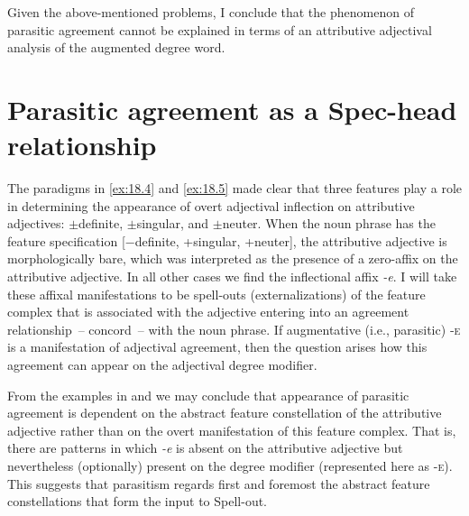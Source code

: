 \documentclass[output=paper]{langsci/langscibook}
\begin{document}
Given the above-mentioned problems, I conclude that the phenomenon of parasitic
agreement cannot be explained in terms of an attributive adjectival analysis of
the augmented degree word.

\section{Parasitic agreement as a Spec-head relationship}\label{sec:18.7}

The paradigms in \eqref{ex:18.4} and \eqref{ex:18.5} made clear that
three features play a role in determining the appearance of overt adjectival
inflection on  attributive adjectives: $\pm$definite, $\pm$singular,
and $\pm$neuter. When the noun phrase has the feature specification [−definite,
+singular, +neuter], the attributive adjective is morphologically bare, which
was interpreted as the presence of a zero-affix on the attributive adjective.
In all other cases we find the inflectional affix \emph{-e}. I will take these
affixal manifestations to be spell-outs (externalizations) of the feature
complex that is associated with the adjective entering into an agreement
relationship~-- concord~-- with the noun phrase. If augmentative (i.e.,
parasitic) \textsc{‑e} is a manifestation of adjectival agreement, then the
question arises how this agreement can appear on the adjectival degree
modifier.

From the examples in  and  we may conclude that
appearance of parasitic agreement is dependent on the abstract feature
constellation of the attributive adjective rather than on the overt
manifestation of this feature complex. That is, there are patterns in which
\emph{-e} is absent on the attributive adjective but nevertheless (optionally)
present on the degree modifier (represented here as \textsc{-e}). This suggests
that parasitism regards first and foremost the abstract feature constellations
that form the input to Spell-out.
\end{document}
